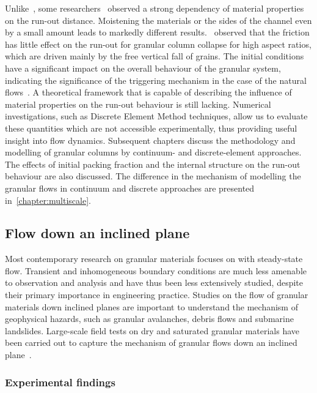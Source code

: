 Unlike~\citet{Lube2005}, some 
researchers~\citep{Balmforth2005,Kerswell2005} observed a strong dependency of 
material properties on the run-out distance. Moistening the materials or the 
sides of the channel even by a small amount leads to markedly different 
results.~\citet{Staron2007a} observed that the friction has little effect on 
the run-out for granular column collapse for high aspect ratios, which are 
driven mainly by the free vertical fall of grains. The initial conditions have 
a significant impact on the overall behaviour of the granular system, 
indicating the significance of the triggering mechanism in the case of the 
natural flows~\citep{Staron2007a}. A theoretical framework that is capable of 
describing the influence of material properties on the run-out behaviour is 
still lacking. Numerical investigations, such as Discrete Element 
Method techniques, allow us to evaluate these quantities which are not 
accessible experimentally, thus providing useful insight into flow 
dynamics. Subsequent chapters discuss the methodology and modelling of granular 
columns by continuum- and discrete-element approaches. The effects of initial 
packing fraction and the internal structure on the run-out behaviour are also 
discussed. The difference in the mechanism of modelling the granular flows in 
continuum and discrete approaches are presented in~\cref{chapter:multiscale}.

\subsection{Flow down an inclined plane}

Most contemporary research on granular materials focuses on
with steady-state flow. Transient and inhomogeneous boundary conditions 
are much less amenable to observation and analysis and have thus been less 
extensively studied, despite their primary importance in engineering practice. 
Studies on the flow of granular materials down inclined planes are important to 
understand the mechanism of geophysical hazards, such as granular avalanches, 
debris flows and submarine landslides. Large-scale field tests on dry and 
saturated granular materials have been carried out to capture the mechanism of 
granular flows down an inclined plane~\citep{Okada2008,Denlinger2001}.


\subsubsection{Experimental findings}

